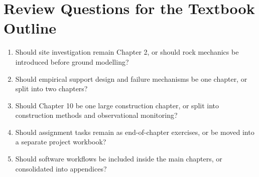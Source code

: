 \documentclass[12pt,oneside]{book}
\begin{document}
\chapter{Review Questions for the Textbook Outline}
\begin{enumerate}
    \item Should site investigation remain Chapter 2, or should rock mechanics be introduced before ground modelling?
    \item Should empirical support design and failure mechanisms be one chapter, or split into two chapters?
    \item Should Chapter 10 be one large construction chapter, or split into construction methods and observational monitoring?
    \item Should assignment tasks remain as end-of-chapter exercises, or be moved into a separate project workbook?
    \item Should software workflows be included inside the main chapters, or consolidated into appendices?
\end{enumerate}
\end{document}
